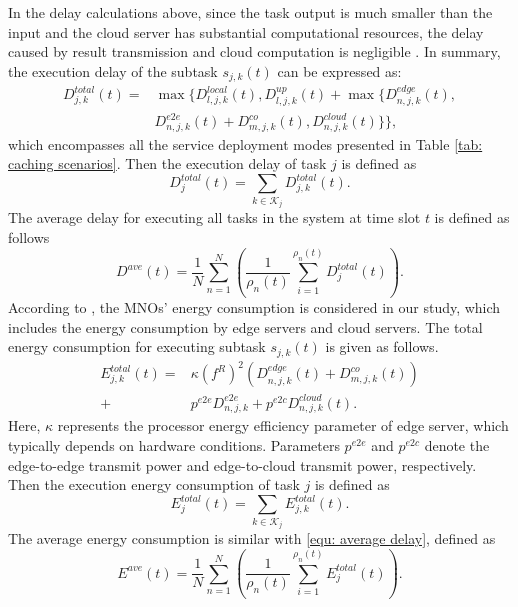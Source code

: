 \documentclass[lettersize,journal]{IEEEtran}
\begin{document}
In the delay calculations above, since the task output is much smaller than the input and the cloud server has substantial computational resources, the delay caused by result transmission and cloud computation is negligible \cite{JJWu}.  
In summary, the execution delay of the subtask $ s_{j,k}(t) $ can be expressed as:
\begin{equation}
	\label{equ: subtask delay}
	\begin{aligned}
		D_{j,k}^{total}(t) = & \max \Bigg \{ D^{local}_{l,j,k}(t), D^{up}_{l,j,k}(t) + \max \Big\{D^{edge}_{n,j,k}(t),  \\
		&   D^{e2e}_{n,j,k}(t)+D^{co}_{m,j,k}(t),  D^{cloud}_{n,j,k}(t)\Big\} \Bigg\}, 
	\end{aligned}
\end{equation}
which encompasses all the service deployment modes presented in Table \ref{tab: caching scenarios}. 
Then the execution delay of task $ j $ is defined as
\begin{equation}
	\label{equ: total delay}
	D_{j}^{total}(t) = \sum_{k \in \mathcal{K}_j}{D_{j,k}^{total}(t)}.
\end{equation}
The average delay for executing all tasks in the system at time slot $ t $ is defined as follows
\begin{equation}
	\label{equ: average delay}
	D^{ave}(t) = \frac{1}{N} \sum_{n=1}^{N} \left( \frac{1}{\rho_{n}(t)} \sum_{i=1}^{\rho_{n}(t)} D_{j}^{total}(t) \right).
\end{equation}
According to \cite{KongDuan-10}, the MNOs' energy consumption is considered in our study, which includes the energy consumption by edge servers and cloud servers. The total energy consumption for executing subtask $ s_{j,k}(t) $ is given as follows.
\begin{equation}
	\label{equ: subtask energy consumption}
	\begin{aligned}
		E_{j,k}^{total}(t) = & \kappa (f^{R})^2 \left( D^{edge}_{n,j,k}(t)+D^{co}_{m,j,k}(t) \right)  \\
		+ & p^{e2e} D_{n,j,k}^{e2e} + p^{e2c} D^{cloud}_{n,j,k}(t).
	\end{aligned}
\end{equation}
Here,  $ \kappa $ represents the processor energy efficiency parameter of edge server, which typically depends on hardware conditions. Parameters $ p^{e2e} $ and  $ p^{e2c} $ denote the edge-to-edge transmit power and  edge-to-cloud transmit power, respectively.  
Then the execution energy consumption of task $ j $ is defined as
\begin{equation}
	\label{equ: total energy consumption}
	E_{j}^{total}(t) = \sum_{k \in \mathcal{K}_j}{E_{j,k}^{total}(t)}.
\end{equation}
The average energy consumption is similar with \eqref{equ: average delay}, defined as
\begin{equation}
	\label{average energy consumption}
	E^{ave}(t) = \frac{1}{N} \sum_{n=1}^{N} \left( \frac{1}{\rho_{n}(t)} \sum_{i=1}^{\rho_{n}(t)} E_{j}^{total}(t) \right).
\end{equation}
\end{document}
